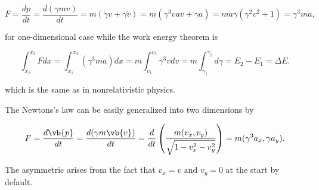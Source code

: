\documentclass[english,a4paper,12pt]{report}
\begin{document}
\begin{equation}
    F = \frac{dp}{dt} = \frac{d(\gamma mv)}{dt} = m(\dot{\gamma }v + \gamma \dot{v}  ) = m(\gamma ^3 vav + \gamma a) = ma\gamma (\gamma ^2v^2 + 1) = \gamma ^3 ma,
\end{equation}

for one-dimensional case while the work energy theorem is 

\begin{equation}
    \int_{x_1 }^{x_2 } Fdx = \int_{x_1 }^{x_2 } (\gamma ^3 ma) dx = m \int_{v_1 }^{v_2 } \gamma ^3 vdv = m \int_{\gamma _{1} }^{\gamma _{2} } d\gamma = E_2 - E_1 = \Delta E.      
\end{equation}

which is the same as in nonrelativistic physics.

The Newtons's law can be easily generalized into two dimensions by 

\begin{equation}
    F = \frac{d\vb{p} }{dt} = \frac{d(\gamma m\vb{v} )}{dt} = \frac{d}{dt} \left(\frac{m(v_{x}, v_{y}  )}{\sqrt{1 - v_{x}^2 - v_{y}^2  } }\right) = m(\gamma ^3 a_{x}, \gamma a_{y}  ).    
\end{equation}

The asymmetric arises from the fact that \(v_{x} = v \text { and }  v_{y} = 0 \) at the start by default.
\end{document}
